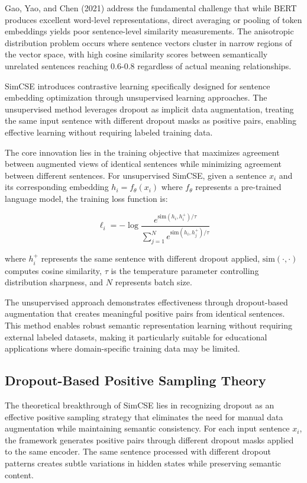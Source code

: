 {{Gao, Yao, and Chen (2021) address the fundamental challenge that while BERT produces excellent word-level representations, direct averaging or pooling of token embeddings yields poor sentence-level similarity measurements. The anisotropic distribution problem occurs where sentence vectors cluster in narrow regions of the vector space, with high cosine similarity scores between semantically unrelated sentences reaching 0.6-0.8 regardless of actual meaning relationships.

{\color{maroon}
SimCSE introduces contrastive learning specifically designed for sentence embedding optimization through unsupervised learning approaches. The unsupervised method leverages dropout as implicit data augmentation, treating the same input sentence with different dropout masks as positive pairs, enabling effective learning without requiring labeled training data.

The core innovation lies in the training objective that maximizes agreement between augmented views of identical sentences while minimizing agreement between different sentences. For unsupervised SimCSE, given a sentence $x_i$ and its corresponding embedding $h_i = f_\theta(x_i)$ where $f_\theta$ represents a pre-trained language model, the training loss function is:
}

\begin{equation}
\ell_i = -\log \frac{e^{\text{sim}(h_i, h_i^+)/\tau}}{\sum_{j=1}^{N} e^{\text{sim}(h_i, h_j^+)/\tau}}
\end{equation}

where $h_i^+$ represents the same sentence with different dropout applied, $\text{sim}(\cdot,\cdot)$ computes cosine similarity, $\tau$ is the temperature parameter controlling distribution sharpness, and $N$ represents batch size.

{\color{maroon}
The unsupervised approach demonstrates effectiveness through dropout-based augmentation that creates meaningful positive pairs from identical sentences. This method enables robust semantic representation learning without requiring external labeled datasets, making it particularly suitable for educational applications where domain-specific training data may be limited.
}

\subsection{Dropout-Based Positive Sampling Theory}

The theoretical breakthrough of SimCSE lies in recognizing dropout as an effective positive sampling strategy that eliminates the need for manual data augmentation while maintaining semantic consistency. For each input sentence $x_i$, the framework generates positive pairs through different dropout masks applied to the same encoder. The same sentence processed with different dropout patterns creates subtle variations in hidden states while preserving semantic content.

}}
